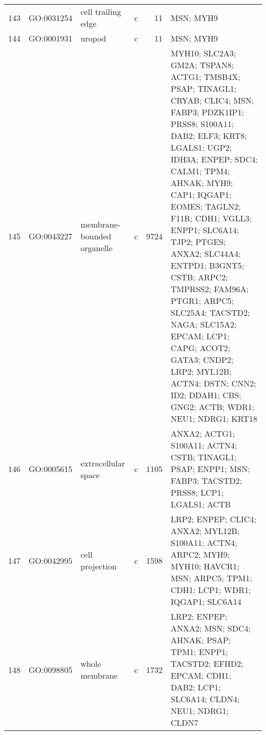 \begin{table}[htp]
\begin{center}
\begin{tabular}{rlllrl}
  143 & GO:0031254 & cell trailing edge & c &  11 & MSN; MYH9 \\ 
  144 & GO:0001931 & uropod & c &  11 & MSN; MYH9 \\ 
  145 & GO:0043227 & membrane-bounded organelle & c & 9724 & MYH10; SLC2A3; GM2A; TSPAN8; ACTG1; TMSB4X; PSAP; TINAGL1; CRYAB; CLIC4; MSN; FABP3; PDZK1IP1; PRSS8; S100A11; DAB2; ELF3; KRT8; LGALS1; UGP2; IDH3A; ENPEP; SDC4; CALM1; TPM4; AHNAK; MYH9; CAP1; IQGAP1; EOMES; TAGLN2; F11R; CDH1; VGLL3; ENPP1; SLC6A14; TJP2; PTGES; ANXA2; SLC44A4; ENTPD1; B3GNT5; CSTB; ARPC2; TMPRSS2; FAM96A; PTGR1; ARPC5; SLC25A4; TACSTD2; NAGA; SLC15A2; EPCAM; LCP1; CAPG; ACOT2; GATA3; CNDP2; LRP2; MYL12B; ACTN4; DSTN; CNN2; ID2; DDAH1; CBS; GNG2; ACTB; WDR1; NEU1; NDRG1; KRT18 \\ 
  146 & GO:0005615 & extracellular space & c & 1105 & ANXA2; ACTG1; S100A11; ACTN4; CSTB; TINAGL1; PSAP; ENPP1; MSN; FABP3; TACSTD2; PRSS8; LCP1; LGALS1; ACTB \\ 
  147 & GO:0042995 & cell projection & c & 1598 & LRP2; ENPEP; CLIC4; ANXA2; MYL12B; S100A11; ACTN4; ARPC2; MYH9; MYH10; HAVCR1; MSN; ARPC5; TPM1; CDH1; LCP1; WDR1; IQGAP1; SLC6A14 \\ 
  148 & GO:0098805 & whole membrane & c & 1732 & LRP2; ENPEP; ANXA2; MSN; SDC4; AHNAK; PSAP; TPM1; ENPP1; TACSTD2; EFHD2; EPCAM; CDH1; DAB2; LCP1; SLC6A14; CLDN4; NEU1; NDRG1; CLDN7 \\ 
   \hline
\end{tabular}
\end{center} \label{tab:tab7}
  \end{table}

\clearpage



